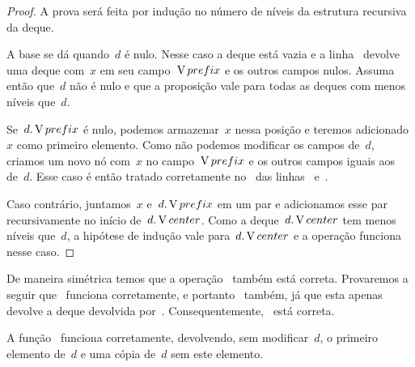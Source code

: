 \documentclass[main.tex]{subfiles}
\begin{document}
\begin{proof}
A prova será feita por indução no número de níveis da estrutura recursiva da deque.

A base se dá quando~$d$ é nulo. Nesse caso a deque está vazia e a linha~ devolve uma deque com~$x$ em seu campo~$\operatorname{V}{prefix}$ e os outros campos nulos. Assuma então que~$d$ não é nulo e que a proposição vale para todas as deques com menos níveis que~$d$.

Se~$d.\operatorname{V}{prefix}$ é nulo, podemos armazenar~$x$ nessa posição e teremos adicionado~$x$ como primeiro elemento. Como não podemos modificar os campos de~$d$, criamos um novo nó com~$x$ no campo~$\operatorname{V}{prefix}$ e os outros campos iguais aos de~$d$. Esse caso é então tratado corretamente no~ das linhas~ e~.

Caso contrário, juntamos~$x$ e~$d.\operatorname{V}{prefix}$ em um par e adicionamos esse par recursivamente no início de~$d.\operatorname{V}{center}$. Como a deque~$d.\operatorname{V}{center}$ tem menos níveis que~$d$, a hipótese de indução vale para~$d.\operatorname{V}{center}$ e a operação funciona nesse caso.
\end{proof}

De maneira simétrica temos que a operação~ também está correta. Provaremos a seguir que~ funciona corretamente, e portanto~ também, já que esta apenas devolve a deque devolvida por~. Consequentemente,~ está correta.

\begin{proposition}
A função~ funciona corretamente, devolvendo, sem modificar~$d$, o primeiro elemento de~$d$ e uma cópia de~$d$ sem este elemento.
\end{proposition}
\end{document}
